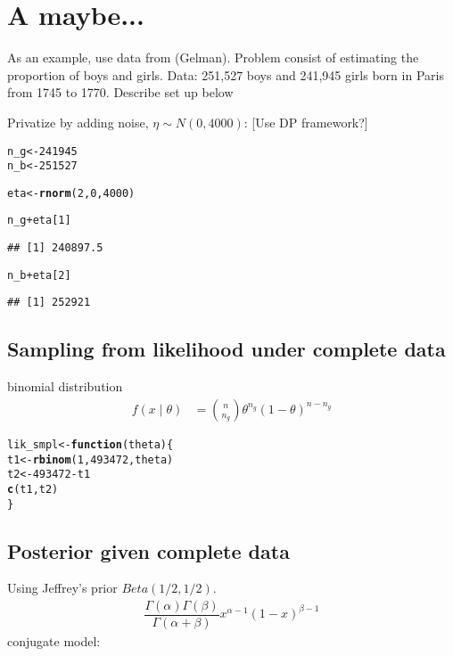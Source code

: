 \documentclass{article}\usepackage[]{graphicx}\usepackage[]{xcolor}
\makeatletter
\newcommand{\hlnum}[1]{\textcolor[rgb]{0.686,0.059,0.569}{#1}}%
\newcommand{\hlopt}[1]{\textcolor[rgb]{0,0,0}{#1}}%
\newcommand{\hlstd}[1]{\textcolor[rgb]{0.345,0.345,0.345}{#1}}%
\newcommand{\hlkwa}[1]{\textcolor[rgb]{0.161,0.373,0.58}{\textbf{#1}}}%
\newcommand{\hlkwb}[1]{\textcolor[rgb]{0.69,0.353,0.396}{#1}}%
\newcommand{\hlkwc}[1]{\textcolor[rgb]{0.333,0.667,0.333}{#1}}%
\newcommand{\hlkwd}[1]{\textcolor[rgb]{0.737,0.353,0.396}{\textbf{#1}}}%
\newenvironment{kframe}{%
 \def\at@end@of@kframe{}%
 \ifinner\ifhmode%
  \def\at@end@of@kframe{\end{minipage}}%
  \begin{minipage}{\columnwidth}%
 \fi\fi%
 \def\FrameCommand##1{\hskip\@totalleftmargin \hskip-\fboxsep
 \colorbox{shadecolor}{##1}\hskip-\fboxsep
     \hskip-\linewidth \hskip-\@totalleftmargin \hskip\columnwidth}%
 \MakeFramed {\advance\hsize-\width
   \@totalleftmargin\z@ \linewidth\hsize
   \@setminipage}}%
 {\par\unskip\endMakeFramed%
 \at@end@of@kframe}
\newenvironment{knitrout}{}{} %
\theoremstyle{definition}
\makeatother
\begin{document}
\newpage

\section*{A maybe...}


As an example, use data from (Gelman). Problem
consist of estimating the proportion of boys and girls.
Data: 251,527 boys and 241,945 girls born in Paris
from 1745 to 1770. Describe set up below

Privatize by adding noise, $\eta \sim N(0, 4000)$:
[Use DP framework?]
\begin{knitrout}
\color{fgcolor}\begin{kframe}
\begin{alltt}
\hlstd{n_g} \hlkwb{<-} \hlnum{241945}
\hlstd{n_b} \hlkwb{<-} \hlnum{251527}

\hlstd{eta} \hlkwb{<-} \hlkwd{rnorm}\hlstd{(}\hlnum{2}\hlstd{,}\hlnum{0}\hlstd{,}\hlnum{4000}\hlstd{)}

\hlstd{n_g} \hlopt{+} \hlstd{eta[}\hlnum{1}\hlstd{]}
\end{alltt}
\begin{verbatim}
## [1] 240897.5
\end{verbatim}
\begin{alltt}
\hlstd{n_b} \hlopt{+} \hlstd{eta[}\hlnum{2}\hlstd{]}
\end{alltt}
\begin{verbatim}
## [1] 252921
\end{verbatim}
\end{kframe}
\end{knitrout}

\subsection*{Sampling from likelihood under complete data}
binomial distribution
\begin{align*}
f(x \mid \theta) &= \binom{n}{n_g} \theta^{n_g}(1-\theta)^{n-n_g}
\end{align*}

\begin{knitrout}
\color{fgcolor}\begin{kframe}
\begin{alltt}
\hlstd{lik_smpl} \hlkwb{<-} \hlkwa{function}\hlstd{(}\hlkwc{theta}\hlstd{) \{}
  \hlstd{t1} \hlkwb{<-} \hlkwd{rbinom}\hlstd{(}\hlnum{1}\hlstd{,} \hlnum{493472}\hlstd{, theta)}
  \hlstd{t2} \hlkwb{<-} \hlnum{493472} \hlopt{-} \hlstd{t1}
  \hlkwd{c}\hlstd{(t1,t2)}
\hlstd{\}}
\end{alltt}
\end{kframe}
\end{knitrout}

\subsection*{Posterior given complete data}
Using Jeffrey's prior $Beta(1/2,1/2)$.
\begin{align*}
\dfrac{\Gamma(\alpha)\Gamma(\beta)}{\Gamma(\alpha + \beta)}x^{\alpha -1}(1-x)^{\beta-1}
\end{align*}
conjugate model:




\nocite{*}


\end{document}
